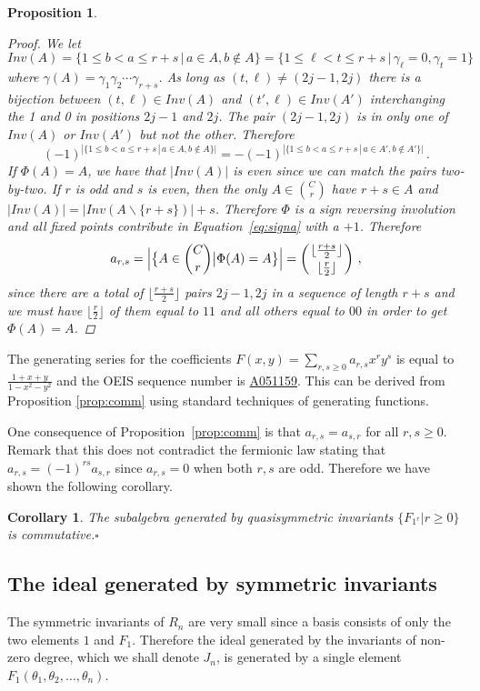 \documentclass[11pt]{amsart}
\newtheorem{prop}[theorem]{Proposition}
\newtheorem{cor}[theorem]{Corollary}
\theoremstyle{definition}
\numberwithin{equation}{section}
\newcommand{\mike}[1]{\todo[size=\tiny,color=lime!30]{#1 \\ \hfill --- Mike}}
\begin{document}
\begin{prop}
\begin{proof}
We let
 $$Inv(A)=\{1\le b<a\le r+s\,|\,a\in A, b\not\in A\}=\{1\le \ell<t\le r+s\,|\,\gamma_\ell=0,\gamma_t=1 \}\,$$
 where $\gamma(A)=\gamma_1\gamma_2\cdots\gamma_{r+s}$.
As long as $(t,\ell)\ne(2j-1,2j)$ there is a bijection between $(t,\ell)\in Inv(A)$ and
$(t',\ell)\in Inv(A')$ interchanging the 1 and 0 in positions $2j-1$ and $2j$.
The pair $(2j-1,2j)$ is in only one of $Inv(A)$ or $Inv(A')$ but not the other. Therefore
$$(-1)^{|\{1\le b<a\le r+s\,|\,a\in A, b\not\in A\}|} = -(-1)^{|\{1\le b<a\le r+s\,|\,a\in A', b\not\in A'\}|}\,.$$
If $\Phi(A)=A$, we have that $|Inv(A)|$ is even since we can match the pairs two-by-two.
If $r$ is odd and $s$ is even, then the only $A \in \binom{C}{r}$ have
$r+s \in A$ and $|Inv(A)| = |Inv(A \backslash \{ r+s \})| + s$.
Therefore $\Phi$ is a sign reversing involution and all fixed points contribute
in Equation~\eqref{eq:signa} with a $+1$. Therefore
$$a_{r,s}=\Big|\big\{ A\in {C\choose r}\big| \Phi(A)=A\big\}\Big|=\left({\lfloor \frac{r+s}{2} \rfloor \atop \lfloor \frac{r}{2} \rfloor}\right)\,,$$
since there are a total of $\lfloor \frac{r+s}{2} \rfloor$ pairs $2j-1,2j$
in a sequence of length $r+s$ and we must have $\lfloor \frac{r}{2} \rfloor$ of them equal to $11$
and all others equal to $00$ in order to get $\Phi(A)=A$.
\end{proof}
\end{prop}

The generating series for the coefficients $F(x,y) = \sum_{r,s \ge 0} a_{r,s} x^{r}y^{s}$ is
equal to $\frac{1 + x + y}{1 - x^{2} - y^{2}}$
and the OEIS \cite{OEIS} sequence number is \href{https://oeis.org/A051159}{A051159}.
This can be derived from Proposition \ref{prop:comm} using standard techniques of generating functions.

One consequence of Proposition~\ref{prop:comm} is that $a_{r,s}=a_{s,r}$ for all $r,s\ge 0$. Remark that this does not contradict the fermionic law stating that $a_{r,s}=(-1)^{rs}a_{s,r}$ since $a_{r,s}=0$ when both $r,s$ are odd. Therefore we have shown the following corollary.

\begin{cor}
The subalgebra generated by quasisymmetric invariants $\{F_{1^r}|r\ge 0\}$ is commutative.\hfill$\square$
\end{cor}

\subsection{The ideal generated by symmetric invariants}
The symmetric invariants of $R_n$ are very small since a basis consists of only the two
elements $1$ and $F_1$.  Therefore the ideal generated by the invariants of non-zero
degree, which we shall denote $J_n$, is generated by a single element
$F_1(\theta_1,\theta_2, \ldots, \theta_n)$.
\end{document}
